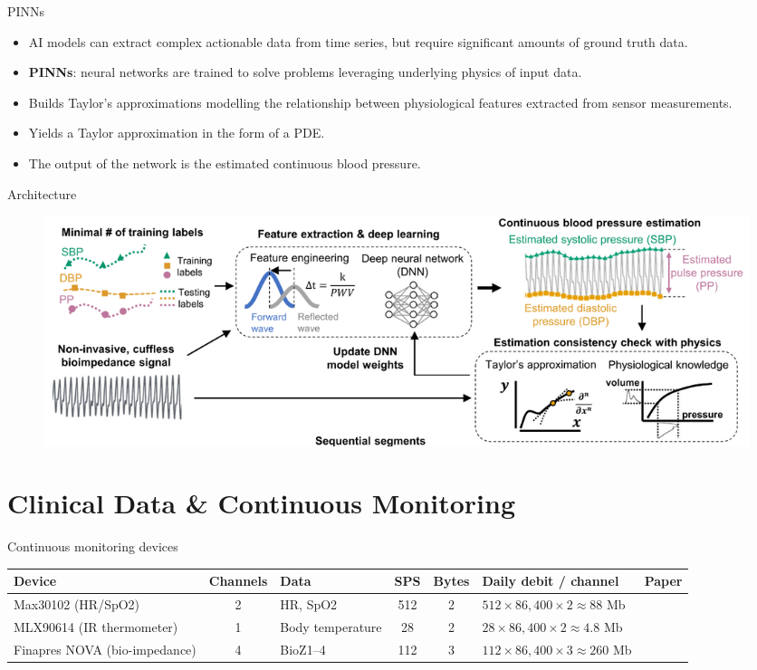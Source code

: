 \documentclass{beamer}
\begin{document}
\begin{frame}{PINNs \cite{jafari2022}}
  \begin{itemize}
    \item AI models can extract complex actionable data from time series, but require significant amounts of ground truth data. 
    \item \textbf{PINNs}: neural networks are trained to solve problems leveraging underlying physics of input data.
    \item Builds Taylor's approximations modelling the relationship between physiological features extracted from sensor measurements.
    \item Yields a Taylor approximation in the form of a PDE.
    \item The output of the network is the estimated continuous blood pressure.
  \end{itemize}
\end{frame}

\begin{frame}{Architecture}
    \begin{figure}
      \centering
      \includegraphics[width=1\linewidth]{images/PINNs-archi.png}
      \caption{\textcite{jafari2022}}
  \end{figure}
\end{frame}

\section{Clinical Data \& Continuous Monitoring}
\begin{frame}{Continuous monitoring devices}

  \scriptsize
  \begin{tabularx}{\textwidth}{|Y|c|Y|c|c|Y|c|}
  \hline
  \textbf{Device} & \textbf{Channels} & \textbf{Data} & \textbf{SPS} & \textbf{Bytes} & \textbf{Daily debit / channel} & \textbf{Paper} \\
  \hline
  Max30102 (HR/SpO2) 
  & 2 
  & HR, SpO2 
  & 512 
  & 2 
  & $512 \times 86{,}400 \times 2 \approx 88$ Mb 
  & \cite{jameil2025digital} \\
  \hline
  MLX90614 (IR thermometer) 
  & 1 
  & Body temperature 
  & 28 
  & 2 
  & $28 \times 86{,}400 \times 2 \approx 4.8$ Mb 
  & \cite{jameil2025digital} \\
  \hline
  Finapres NOVA (bio-impedance) 
  & 4 
  & BioZ1--4 
  & 112 
  & 3 
  & $112 \times 86{,}400 \times 3 \approx 260$ Mb 
  & \cite{jafari2022} \\
  \hline
  \end{tabularx}
  
\end{frame}
\end{document}
